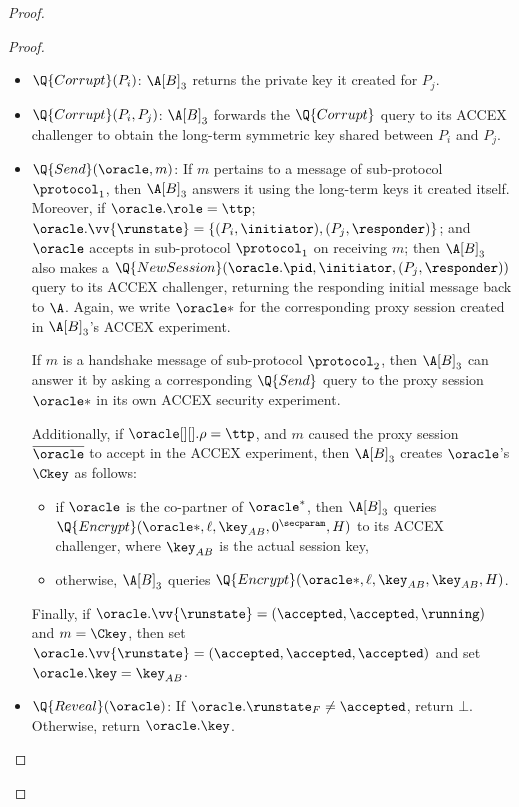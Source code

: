 \begin{proof}
\begin{proof}
\begin{itemize}
	\item $\Q{Corrupt}(P_i)$: 
	$\A[B]_3$ returns the private key it created for $P_j$.
	
	\item $\Q{Corrupt}(P_i, P_j)$: 	
 	$\A[B]_3$ forwards the $\Q{Corrupt}$ query to its ACCEX challenger to obtain the long-term symmetric key shared between $P_i$ and $P_j$.
		 	
	
	\item $\Q{Send}(\oracle, m)$: 
	If 	$m$ pertains to a message of sub-protocol $\protocol_1$,
	then $\A[B]_3$ answers it using the long-term keys it created itself. 
	Moreover,
	if $\oracle.\role = \ttp$;
	$\oracle.\vv{\runstate} = \lbrace (P_i, \initiator), (P_j, \responder) \rbrace$;
	and $\oracle$ accepts in sub-protocol $\protocol_1$ on receiving $m$;
	then $\A[B]_3$ also makes a $\Q{NewSession}(\oracle.\pid,\initiator, (P_j, \responder))$ query to its ACCEX challenger,
	returning the responding initial message back to $\A$. 
	Again, we write $\oracle*$ for the corresponding proxy session created in $\A[B]_3$'s ACCEX experiment.  
	

	
	If $m$ is a handshake message of sub-protocol $\protocol_2$,
	then $\A[B]_3$ can answer it by asking a corresponding $\Q{Send}$ query to the proxy session $\oracle*$ in its own ACCEX security experiment.

	Additionally,
	if $\oracle[][].\rho = \ttp$,
	and $m$ caused the proxy session $\overline{\oracle}$ to accept in the ACCEX experiment,
	then $\A[B]_3$ creates $\oracle$'s $\Ckey$ as follows:
	\begin{itemize}
		\item if $\oracle$ is the co-partner of $\oracle^*$,
		then $\A[B]_3$ queries $\Q{Encrypt}(\oracle*, \ell, \key_{AB}, 0^\secparam, H)$
		to its ACCEX challenger,
		where $\key_{AB}$ is the actual session key,
		
		\item otherwise, $\A[B]_3$ queries $\Q{Encrypt}(\oracle*, \ell, \key_{AB}, \key_{AB}, H)$. 
		
	\end{itemize}
	
	
	Finally, if $\oracle.\vv{\runstate} = (\accepted, \accepted, \running)$ and $m = \Ckey$,
	then set $\oracle.\vv{\runstate} = (\accepted, \accepted, \accepted)$ and set $\oracle.\key = \key_{AB}$.

	\item $\Q{Reveal}(\oracle)$:
	If $\oracle.\runstate_F \neq \accepted$,
	return $\bot$.
	Otherwise, return $\oracle.\key$.


\end{itemize}
\end{proof}
\end{proof}
